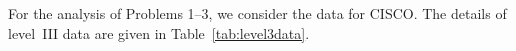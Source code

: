 

For the analysis of Problems 1--3, we consider the data for CISCO. The details of level~III data are given in Table~\ref{tab:level3data}. \twomedskip


